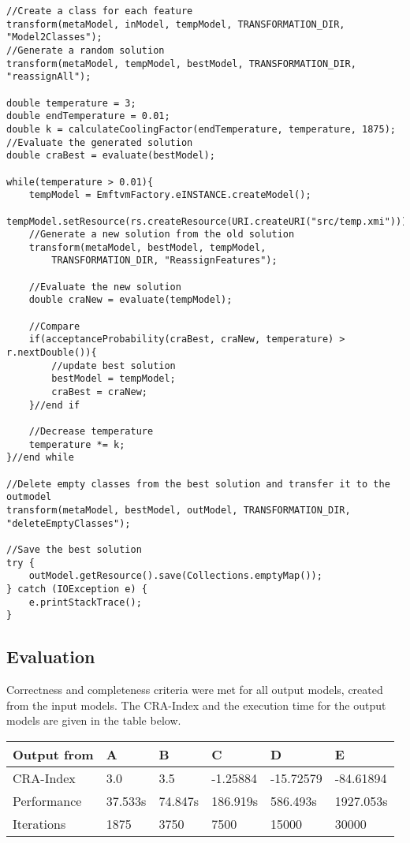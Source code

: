 \documentclass[a4paper]{article}
\begin{document}
\begin{lstlisting}
//Create a class for each feature
transform(metaModel, inModel, tempModel, TRANSFORMATION_DIR, "Model2Classes");
//Generate a random solution
transform(metaModel, tempModel, bestModel, TRANSFORMATION_DIR, "reassignAll");

double temperature = 3;
double endTemperature = 0.01;
double k = calculateCoolingFactor(endTemperature, temperature, 1875);
//Evaluate the generated solution
double craBest = evaluate(bestModel);

while(temperature > 0.01){
	tempModel = EmftvmFactory.eINSTANCE.createModel();
	tempModel.setResource(rs.createResource(URI.createURI("src/temp.xmi")));
	//Generate a new solution from the old solution
	transform(metaModel, bestModel, tempModel,
		TRANSFORMATION_DIR, "ReassignFeatures");

	//Evaluate the new solution
	double craNew = evaluate(tempModel);

	//Compare
	if(acceptanceProbability(craBest, craNew, temperature) > r.nextDouble()){
		//update best solution
		bestModel = tempModel;
		craBest = craNew;
	}//end if

	//Decrease temperature
	temperature *= k;
}//end while

//Delete empty classes from the best solution and transfer it to the outmodel
transform(metaModel, bestModel, outModel, TRANSFORMATION_DIR,
"deleteEmptyClasses");

//Save the best solution
try {
	outModel.getResource().save(Collections.emptyMap());
} catch (IOException e) {
	e.printStackTrace();
}
\end{lstlisting}

\subsection{Evaluation}

Correctness and completeness criteria were met for all output models, created from the input models.
The CRA-Index and the execution time for the output models are given in the table below.

\begin{table}[h]
\begin{center}
\begin{tabular}{|l|l|l|l|l|l|}
\hline
Output from & A & B & C & D & E\\
\hline
CRA-Index & 3.0 & 3.5 & -1.25884 & -15.72579 & -84.61894\\
\hline
Performance & 37.533s & 74.847s & 186.919s & 586.493s & 1927.053s\\
\hline
Iterations & 1875 & 3750 & 7500 & 15000 & 30000\\
\hline
\end{tabular}
\end{center}
\end{table}

~\cite{Abdelhalim2013}

 

\end{document}
